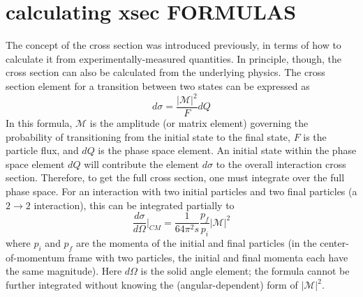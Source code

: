 \section{calculating xsec FORMULAS}




The concept of the cross section was introduced previously, 
in terms of how to calculate it from experimentally-measured 
quantities.  
In principle, though, the cross section 
can also be calculated from the underlying physics.  
The cross section element for a transition 
between two states can be expressed as 
\[
d \sigma = \frac{ \left| \mathcal{M} \right| ^2 }{F} d Q
\]
In this formula, $\mathcal{M}$ is the amplitude 
(or matrix element) governing the probability of 
transitioning from the initial state to the final state, 
$F$ is the particle flux, and $d Q$ is the 
phase space element.  
An initial state within the phase space element $d Q$ will 
contribute the element $d \sigma$ to the overall 
interaction cross section.  
Therefore, to get the full cross section, one must integrate 
over the full phase space.  
For an interaction with two initial particles and 
two final particles 
(a $2 \rightarrow 2$ interaction), 
this can be integrated partially to 
\[
\frac{d \sigma}{d \Omega} \bigg| _{CM} 
= \frac{1}{64 \pi^2 s} \frac{p_f}{p_i} \left| \mathcal{M} \right| ^2
\]
where $p_i$ and $p_f$ are the momenta of the initial and final particles 
(in the center-of-momentum frame with two particles, 
the initial and final momenta each have the same magnitude).  
Here $d \Omega$ is the solid angle element; 
the formula cannot be further integrated without knowing the 
(angular-dependent) form of $ \left| \mathcal{M} \right| ^2 $.  

